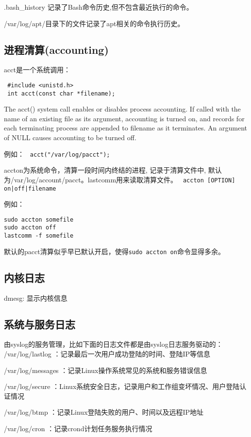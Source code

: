 .bash\_history 记录了Bash命令历史,但不包含最近执行的命令。

/var/log/apt/目录下的文件记录了apt相关的命令执行历史。

\subsection{进程清算(accounting)}

acct是一个系统调用：

\begin{verbatim}
 #include <unistd.h>
 int acct(const char *filename);
\end{verbatim}

The  acct()  system  call  enables  or  disables process accounting.  If called with the name of an existing file as its argument,
accounting is turned on, and records for each terminating process are appended to filename as it terminates.  An argument of  NULL
causes accounting to be turned off.

例如：
\verb+ acct("/var/log/pacct");+

accton为系统命令，清算一段时间内终结的进程, 记录于清算文件中, 默认为/var/log/account/pacct。lastcomm用来读取清算文件。
\verb+ accton [OPTION] on|off|filename+

例如：
\begin{verbatim}
sudo accton somefile
sudo accton off
lastcomm -f somefile
\end{verbatim}

默认的pacct清算似乎早已默认开启，使得\verb+sudo accton on+命令显得多余。


\subsection{内核日志}
dmesg: 显示内核信息

\subsection{系统与服务日志}
由syslog的服务管理，比如下面的日志文件都是由syslog日志服务驱动的：      
/var/log/lastlog ：记录最后一次用户成功登陆的时间、登陆IP等信息 

/var/log/messages ：记录Linux操作系统常见的系统和服务错误信息 

/var/log/secure ：Linux系统安全日志，记录用户和工作组变坏情况、用户登陆认证情况 

/var/log/btmp ：记录Linux登陆失败的用户、时间以及远程IP地址 

/var/log/cron ：记录crond计划任务服务执行情况

